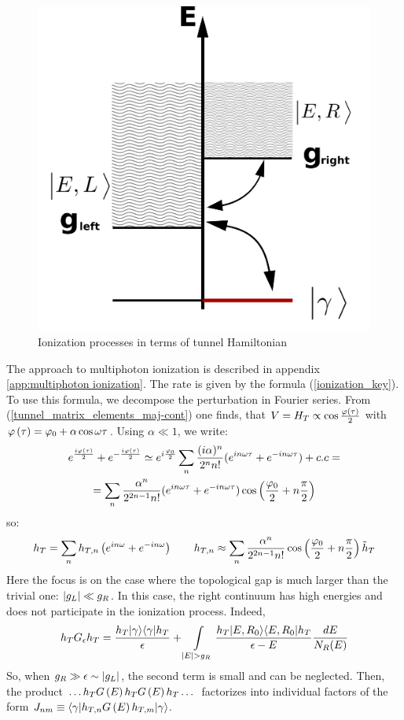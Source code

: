 \begin{figure}[H]
	\centering
	\includegraphics[width=0.65\linewidth]{images/tunneling}
	\caption{Ionization processes in terms of tunnel Hamiltonian}
	\label{fig:tunneling}
\end{figure}

The approach to multiphoton ionization is described in appendix \ref{app:multiphoton ionization}. The rate is given by the formula   (\ref{ionization_key}). To use this formula, we decompose the  perturbation in Fourier series. From  (\ref{tunnel_matrix_elements_maj-cont}) one finds, that $ V=H_T\propto\cos\frac{\varphi\left(\tau\right)}{2} $ with $ \varphi\left(\tau\right)=\varphi_{0}+\alpha\cos\omega \tau $. Using $ \alpha\ll1 $, we write:
\begin{multline}
	e^{\frac{i\varphi\left(\tau\right)}{2}}+e^{-\frac{i\varphi\left(\tau\right)}{2}}\simeq e^{i\frac{\varphi_{0}}{2}}\sum_{n}\frac{(i\alpha)^{n}}{2^{n}n!}(e^{in\omega \tau}+e^{-in\omega \tau})+c.c=
	\\
	=\sum_{n}\frac{\alpha{}^{n}}{2^{2n-1}n!}(e^{in\omega \tau}+e^{-in\omega \tau})\cos\left(\frac{\varphi_{0}}{2}+n\frac{\pi}{2}\right)
\end{multline}
so:
\begin{gather}
	h_{T}=
	\sum_n
	h_{T,n}
	\left(
	e^{in\omega }
	+
	e^{-in\omega }
	\right)
	\qquad
	h_{T,n}
	\approx
	\sum_{n}	
	\frac
	{\alpha^{n}}
	{2^{2n-1}n!}
	\cos\left(\frac{\varphi_{0}}{2}+n\frac{\pi}{2}\right)
	\tilde{h}_{T}
\end{gather}
Here the focus is on the case where the topological gap is much larger than the trivial one: $ \left|g_L\right|\ll g_R $. In this case, the right continuum has high energies and does not participate in the ionization process. Indeed,
\begin{gather}
	h_T G_{\epsilon} h_T
	=
	\frac{h_T|\gamma\rangle\langle\gamma|h_T}{\epsilon}
	+
	\intop_{|E|>g_{R}}
	\frac{h_T|E,R_0\rangle\langle E,R_0|h_T}{\epsilon-E}\frac{dE}{N_{R}(E)}
\end{gather}
So, when $ g_{R}\gg\epsilon\sim \left|g_L\right| $, the second term is small and can be neglected. Then, the product $ \dots h_TG\left(E\right)h_TG\left(E\right)h_T\dots $ factorizes into individual factors of the form $ J_{nm}\equiv\langle\gamma|h_{T,n}G\left(E\right)h_{T,m}|\gamma\rangle $.

